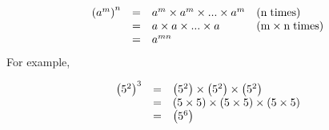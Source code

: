         \label{m38359*uid35}\nopagebreak\noindent{}
    \begin{equation}
    \begin{array}{cclc}\hfill {\left({a}^{m}\right)}^{n}& =& {a}^{m}\ensuremath{\times}{a}^{m}\ensuremath{\times}...\ensuremath{\times}{a}^{m}\hfill & \left(\mathrm{n\; times}\right)\hfill \\ \hfill & =& a\ensuremath{\times}a\ensuremath{\times}...\ensuremath{\times}a\hfill & \left(\mathrm{m}\ensuremath{\times}\mathrm{n\; times}\right)\hfill \\ \hfill & =& {a}^{mn}\hfill & \end{array}
      \end{equation}
        \label{m38359*id66694}For example,\par 
        \label{m38359*id66697}\nopagebreak\noindent{}
          
    \begin{equation}
    \begin{array}{ccl}\hfill {\left({5}^{2}\right)}^{3}& =& \left({5}^{2}\right)\ensuremath{\times}\left({5}^{2}\right)\ensuremath{\times}\left({5}^{2}\right)\hfill \\ & =& \left(5\ensuremath{\times}5\right)\ensuremath{\times}\left(5\ensuremath{\times}5\right)\ensuremath{\times}\left(5\ensuremath{\times}5\right)\hfill \\ & =& \left({5}^{6}\right)\hfill \end{array}
\end{equation}

